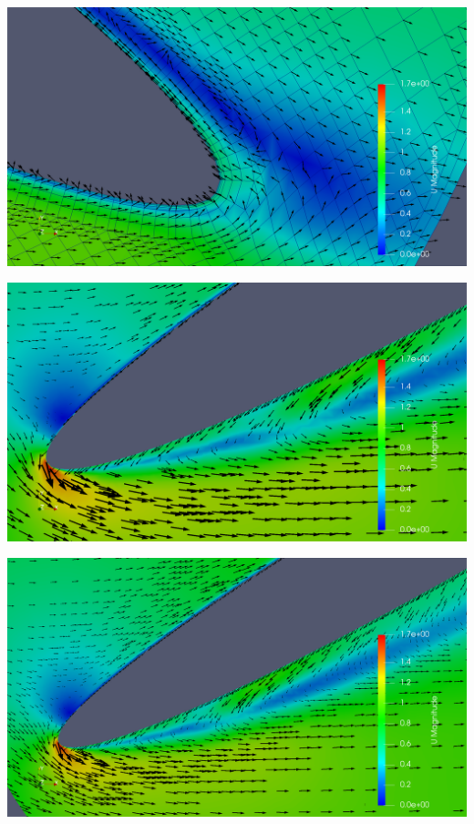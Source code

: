 \documentclass[a4paper,12pt]{article}
\begin{document}
\includegraphics[width=\textwidth]{images/turbulence/recirculation_scalarScaledMESH.png} 

\includegraphics[width=\textwidth]{images/turbulence/recirculation_vectorScaled.png} 

\includegraphics[width=\textwidth]{images/turbulence/recirculation_vectorScaled2.png} 
\end{document}
